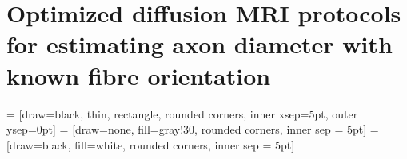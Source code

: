 \chapter[Diffusion MRI protocols for single fibre structures]{Optimized diffusion MRI protocols for estimating axon diameter with known fibre orientation}
 = [draw=black, thin, rectangle, rounded corners, inner xsep=5pt, outer ysep=0pt]  = [draw=none, fill=gray!30, rounded corners, inner sep = 5pt]  = [draw=black, fill=white, rounded corners, inner sep = 5pt]

\newcommand{\SF}{{\ensuremath{\mathcal{SF}}}}
\newcommand{\OI}{{\ensuremath{\mathcal{OI}}}}
\newcommand{\SD}{{\ensuremath{\mathcal{SF}_{pulses}}}}
\newcommand{\DO}{{\ensuremath{\mathcal{SF}_{dirs}}}}
\newcommand{\FD}{{\SF}}



\newcommand{\SFshort}{SF$_{90}$}
\newcommand{\SFlong}{SF$_{360}$}
\newcommand{\OIlong}{OI$_{360}$}




%

